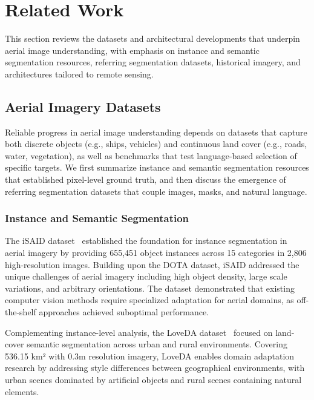 
\section{Related Work}
\label{sec:related}

This section reviews the datasets and architectural developments that underpin aerial image understanding, with emphasis on instance and semantic segmentation resources, referring segmentation datasets, historical imagery, and architectures tailored to remote sensing.

\subsection{Aerial Imagery Datasets}

Reliable progress in aerial image understanding depends on datasets that capture both discrete objects (e.g., ships, vehicles) and continuous land cover (e.g., roads, water, vegetation), as well as benchmarks that test language-based selection of specific targets. We first summarize instance and semantic segmentation resources that established pixel-level ground truth, and then discuss the emergence of referring segmentation datasets that couple images, masks, and natural language.

\subsubsection{Instance and Semantic Segmentation}

The iSAID dataset~\cite{zamir2019isaid} established the foundation for instance segmentation in aerial imagery by providing 655,451 object instances across 15 categories in 2,806 high-resolution images. Building upon the DOTA dataset, iSAID addressed the unique challenges of aerial imagery including high object density, large scale variations, and arbitrary orientations. The dataset demonstrated that existing computer vision methods require specialized adaptation for aerial domains, as off-the-shelf approaches achieved suboptimal performance.

Complementing instance-level analysis, the LoveDA dataset~\cite{wang2021loveda} focused on land-cover semantic segmentation across urban and rural environments. Covering 536.15 km² with 0.3m resolution imagery, LoveDA enables domain adaptation research by addressing style differences between geographical environments, with urban scenes dominated by artificial objects and rural scenes containing natural elements.

